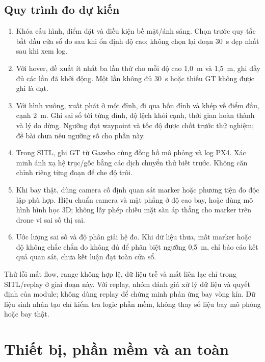 \documentclass[a4paper,12pt]{article}
\begin{document}
\subsection{Quy trình đo dự kiến}
\begin{enumerate}
\item Khóa cấu hình, điểm đặt và điều kiện bề mặt/ánh sáng. Chọn trước quy tắc bắt đầu cửa sổ đo sau khi ổn định độ cao; không chọn lại đoạn 30~s đẹp nhất sau khi xem log.
\item Với hover, đề xuất ít nhất ba lần thử cho mỗi độ cao 1,0~m và 1,5~m, ghi đầy đủ các lần đã khởi động. Một lần không đủ 30~s hoặc thiếu GT không được ghi là đạt.
\item Với hình vuông, xuất phát ở một đỉnh, đi qua bốn đỉnh và khép về điểm đầu, cạnh 2~m. Ghi sai số tới từng đỉnh, độ lệch khỏi cạnh, thời gian hoàn thành và lý do dừng. Ngưỡng đạt waypoint và tốc độ được chốt trước thử nghiệm; đề bài chưa nêu ngưỡng số cho phần này.
\item Trong SITL, ghi GT từ Gazebo cùng đồng hồ mô phỏng và log PX4. Xác minh ánh xạ hệ trục/gốc bằng các dịch chuyển thử biết trước. Không căn chỉnh riêng từng đoạn để che độ trôi.
\item Khi bay thật, dùng camera cố định quan sát marker hoặc phương tiện đo độc lập phù hợp. Hiệu chuẩn camera và mặt phẳng ở độ cao bay, hoặc dùng mô hình hình học 3D; không lấy phép chiếu mặt sàn áp thẳng cho marker trên drone vì sai số thị sai.
\item Ước lượng sai số và độ phân giải hệ đo. Khi dữ liệu thưa, mất marker hoặc độ không chắc chắn đo không đủ để phân biệt ngưỡng 0,5~m, chỉ báo cáo kết quả quan sát, chưa kết luận đạt toàn cửa sổ.
\end{enumerate}

Thử lỗi mất flow, range không hợp lệ, dữ liệu trễ và mất liên lạc chỉ trong SITL/replay ở giai đoạn này. Với replay, nhóm đánh giá xử lý dữ liệu và quyết định của module; không dùng replay để chứng minh phản ứng bay vòng kín. Dữ liệu sinh nhân tạo chỉ kiểm tra logic phần mềm, không thay số liệu bay mô phỏng hoặc bay thật.

\section{Thiết bị, phần mềm và an toàn}
\end{document}
